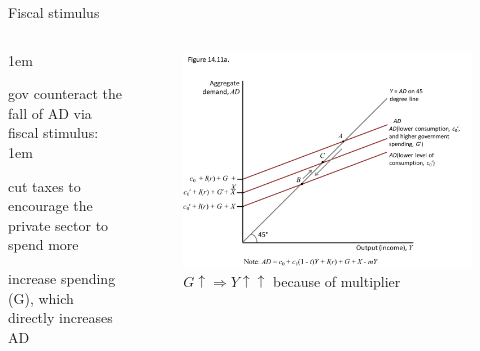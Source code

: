 \documentclass[11pt,aspectratio=43,usenames,dvipsnames]{beamer}
\let\olditemize=\itemize
\let\endolditemize=\enditemize
\renewenvironment{itemize}{\olditemize \itemsep1em}{\endolditemize}
\theoremstyle{definition}
\begin{document}
\begin{frame}{Fiscal stimulus}
\label{slide:Fiscal_stimulus}
    \begin{columns}
        \begin{column}{0.3\textwidth}
            \begin{itemize}
                \item gov counteract the fall of AD via \alert{fiscal stimulus}:
                \begin{itemize}
                    \item \alert{cut taxes} to encourage the private sector to spend more
                    \item \alert{increase spending (G)}, which directly increases AD
                \end{itemize}

            \end{itemize}

        \end{column}
        \begin{column}{0.7\textwidth}
            \begin{figure}
                \centering
                \includegraphics[width=\textwidth]{./figures/14.pdf}
                \caption{$G \uparrow \Rightarrow Y\uparrow \uparrow $ because of multiplier}
            \end{figure}

        \end{column}
    \end{columns}

\end{frame}
\end{document}
